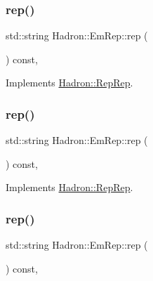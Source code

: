 \subsubsection{\texorpdfstring{rep()}{rep()}\hspace{0.1cm}{\footnotesize\ttfamily [1/3]}}
{\footnotesize\ttfamily std\+::string Hadron\+::\+Em\+Rep\+::rep (\begin{DoxyParamCaption}{ }\end{DoxyParamCaption}) const\hspace{0.3cm}{\ttfamily [inline]}, {\ttfamily [virtual]}}



Implements \mbox{\hyperlink{structHadron_1_1RepRep_ab3213025f6de249f7095892109575fde}{Hadron\+::\+Rep\+Rep}}.

\mbox{\label{structHadron_1_1EmRep_ab85c0592fa268cf31b803c3a128bbfa5}} 
\subsubsection{\texorpdfstring{rep()}{rep()}\hspace{0.1cm}{\footnotesize\ttfamily [2/3]}}
{\footnotesize\ttfamily std\+::string Hadron\+::\+Em\+Rep\+::rep (\begin{DoxyParamCaption}{ }\end{DoxyParamCaption}) const\hspace{0.3cm}{\ttfamily [inline]}, {\ttfamily [virtual]}}



Implements \mbox{\hyperlink{structHadron_1_1RepRep_ab3213025f6de249f7095892109575fde}{Hadron\+::\+Rep\+Rep}}.

\mbox{\label{structHadron_1_1EmRep_ab85c0592fa268cf31b803c3a128bbfa5}} 
\subsubsection{\texorpdfstring{rep()}{rep()}\hspace{0.1cm}{\footnotesize\ttfamily [3/3]}}
{\footnotesize\ttfamily std\+::string Hadron\+::\+Em\+Rep\+::rep (\begin{DoxyParamCaption}{ }\end{DoxyParamCaption}) const\hspace{0.3cm}{\ttfamily [inline]}, {\ttfamily [virtual]}}



